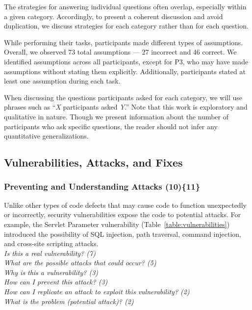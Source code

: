 \documentclass[10pt,journal,compsoc]{IEEEtran}
\begin{document}
The strategies for answering individual questions often overlap, especially within a given category.
Accordingly, to present a coherent discussion and avoid duplication, we discuss strategies for each category rather than for each question.

While performing their tasks, participants made different types of assumptions. 
Overall, we observed 73 total assumptions --- 27 incorrect and 46 correct. 
We identified assumptions across all participants, except for P3, who may have made assumptions without stating them explicitly.
Additionally, participants stated at least one assumption during each task.


When discussing the questions participants asked for each category, we will use phrases such as ``\emph{X} participants asked \emph{Y}.''
Note that this work is exploratory and qualitative in nature.
Though we present information about the number of participants who ask specific questions, the reader should not infer any quantitative generalizations.

\subsection{Vulnerabilities, Attacks, and Fixes}
\label{sec:results-vaf}

\subsubsection{Preventing and Understanding Attacks (10)\{11\}}
\label{pupa}
Unlike other types of code defects that may cause code to function unexpectedly or incorrectly, security vulnerabilities expose the code to potential attacks. For example, the Servlet Parameter vulnerability (Table~\ref{table:vulnerabilities}) introduced the possibility of SQL injection, path traversal, command injection, and cross-site scripting attacks.
\\

\noindent\emph{Is this a real vulnerability? (7)} \\
\emph{What are the possible attacks that could occur? (5)} \\
\emph{Why is this a vulnerability? (3)} \\
\emph{How can I prevent this attack? (3)} \\
\emph{How can I replicate an attack to exploit this vulnerability? (2)} \\
\emph{What is the problem (potential attack)? (2)} 
\\
\end{document}
